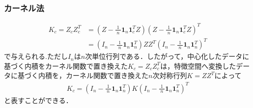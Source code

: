 \documentclass[dvipdfmx,cjk]{beamer}
\theoremstyle{example}
\begin{document}
\begin{frame}
    \frametitle{カーネル法}
    \begin{align*}
        K_c=Z_cZ_c^T & =\left(Z-\frac{1}{\;n\;}\boldsymbol{1}_n\boldsymbol{1}_c^TZ\right)\left(Z-\frac{1}{\;n\;}\boldsymbol{1}_n\boldsymbol{1}_c^TZ\right)^T       \\
                     & =\left(I_n-\frac{1}{\;n\;}\boldsymbol{1}_n\boldsymbol{1}_n^T\right)ZZ^T\left(I_n-\frac{1}{\;n\;}\boldsymbol{1}_n\boldsymbol{1}_n^T\right)^T
    \end{align*}
    で与えられる.ただし$I_n$は$n$次単位行列である．したがって，中心化したデータに基づく内積をカーネル関数で置き換えた$K_c=Z_cZ_c^T$は，特徴空間へ変換したデータに基づく内積を，カーネル関数で置き換えた$n$次対称行列$K=ZZ^T$によって
    \begin{align*}
        K_c=\left(I_n-\frac{1}{\;n\;}\boldsymbol{1}_n\boldsymbol{1}_n^T\right)K\left(I_n-\frac{1}{\;n\;}\boldsymbol{1}_n\boldsymbol{1}_n^T\right)^T
    \end{align*}
    と表すことができる．
\end{frame}
\end{document}
